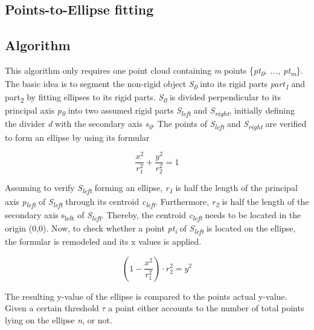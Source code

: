 \documentclass[a4paper,english,11pt]{report}
\begin{document}
\subsection{Points-to-Ellipse fitting}

\subsection{Algorithm}

This algorithm only requires one point cloud containing \textit{m} points \{\textit{pt\textsubscript{0}, ..., pt\textsubscript{m}}\}. The basic idea is to segment the non-rigid object  \textit{S\textsubscript{0}} into its rigid parts \textit{part\textsubscript{1}} and {part\textsubscript{2}} by fitting ellipses to its rigid parts. 
\textit{S\textsubscript{0}} is divided perpendicular to its principal axis \textit{p\textsubscript{0}} into two assumed rigid parts \textit{S\textsubscript{left}} and \textit{S\textsubscript{right}}, initially defining the divider \textit{d} with the secondary axis \textit{s\textsubscript{0}}. The points of \textit{S\textsubscript{left}} and \textit{S\textsubscript{right}} are verified to 
form an ellipse by using its formular

\begin{equation}
\dfrac{x^2}{r_1^2} + \dfrac{y^2}{r_2^2} = 1
\end{equation}

Assuming to verify \textit{S\textsubscript{left}} forming an ellipse, \textit{r\textsubscript{1}} is half the length of the principal axis \textit{p\textsubscript{left}} of \textit{S\textsubscript{left}} through its centroid \textit{c\textsubscript{left}}. Furthermore, \textit{r\textsubscript{2}} is half the length of the secondary axis {s\textsubscript{left}} of \textit{S\textsubscript{left}}. Thereby, the centroid \textit{c\textsubscript{left}} needs to be located in the origin (0,0). 
Now, to check whether a point \textit{pt\textsubscript{i}} of \textit{S\textsubscript{left}} is located on the ellipse, the formular is remodeled and its x values is applied. 

\begin{equation}
(1 -  \dfrac{x^2}{r_1^2}) \cdot {r_2^2} = y^2
\end{equation}

The resulting y-value of the ellipse is compared to the points actual y-value. Given a certain threshold $\tau$ a point either accounts to the number of total points lying on the ellipse \textit{n}, or not.
\end{document}
